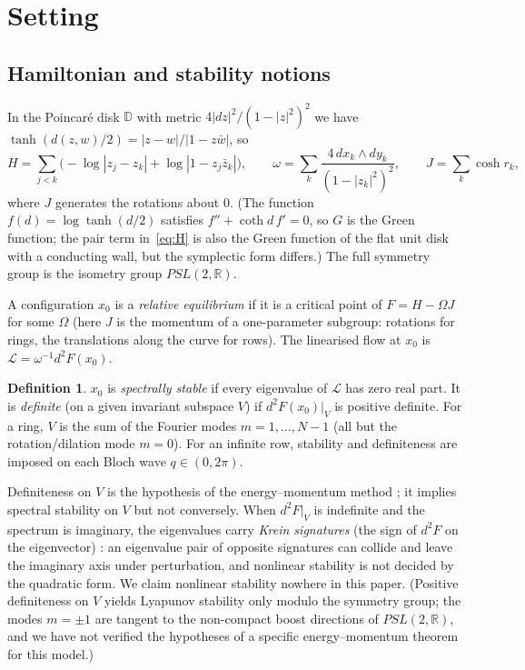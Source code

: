 \documentclass[11pt]{article}
\theoremstyle{definition}
\newtheorem{definition}[theorem]{Definition}
\theoremstyle{remark}
\newcommand{\D}{\mathbb D}
\begin{document}
\section{Setting}\label{sec:setting}

\subsection{Hamiltonian and stability notions}
In the Poincar\'e disk $\D$ with metric $4|dz|^2/(1-|z|^2)^2$ we have $\tanh(d(z,w)/2)=|z-w|/|1-z\bar w|$, so
\begin{equation}\label{eq:H}
H=\sum_{j<k}\Big(-\log|z_j-z_k|+\log|1-z_j\bar z_k|\Big),\qquad
\omega=\sum_k\frac{4\,dx_k\wedge dy_k}{(1-|z_k|^2)^2},\qquad J=\sum_k\cosh r_k,
\end{equation}
where $J$ generates the rotations about $0$. (The function $f(d)=\log\tanh(d/2)$ satisfies $f''+\coth d\,f'=0$, so $G$ is the
Green function; the pair term in~\eqref{eq:H} is also the Green function of the flat unit disk with a conducting wall, but the
symplectic form differs.) The full symmetry group is the isometry group $PSL(2,\mathbb R)$.

A configuration $x_0$ is a \emph{relative equilibrium} if it is a critical point of $F=H-\Omega J$ for some $\Omega$ (here
$J$ is the momentum of a one-parameter subgroup: rotations for rings, the translations along the curve for rows). The
linearised flow at $x_0$ is $\mathcal L=\omega^{-1}d^2F(x_0)$.
\begin{definition}\label{def:stab}
$x_0$ is \emph{spectrally stable} if every eigenvalue of $\mathcal L$ has zero real part. It is \emph{definite} (on a given
invariant subspace $V$) if $d^2F(x_0)|_V$ is positive definite. For a ring, $V$ is the sum of the Fourier modes
$m=1,\dots,N-1$ (all but the rotation/dilation mode $m=0$). For an infinite row, stability and definiteness are imposed on each
Bloch wave $q\in(0,2\pi)$.
\end{definition}
Definiteness on $V$ is the hypothesis of the energy--momentum method \cite{SimoLewisMarsden1991}; it implies spectral stability
on $V$ but not conversely. When $d^2F|_V$ is indefinite and the spectrum is imaginary, the eigenvalues carry \emph{Krein
signatures} (the sign of $d^2F$ on the eigenvector) \cite{MacKay1986}: an eigenvalue pair of opposite signatures can
collide and leave the imaginary axis under perturbation, and nonlinear stability is not decided by the quadratic form. We
claim nonlinear stability nowhere in this paper. (Positive definiteness on $V$ yields Lyapunov stability only modulo the
symmetry group; the modes $m=\pm1$ are tangent to the non-compact boost directions of $PSL(2,\mathbb R)$, and we have not
verified the hypotheses of a specific energy--momentum theorem for this model.)
\end{document}
